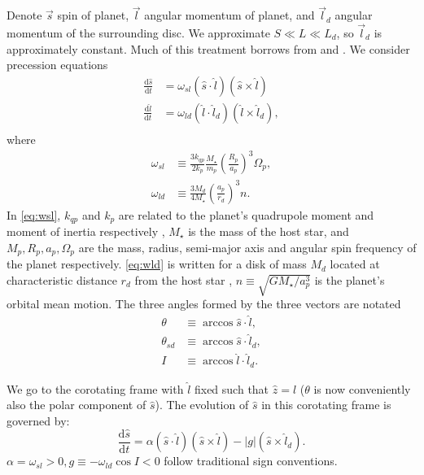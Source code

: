 \documentclass[
        fleqn,
        usenatbib,
    ]{mnras}
\newcommand*{\rd}[2]{\frac{\mathrm{d}#1}{\mathrm{d}#2}}
\newcommand*{\abs}[1]{\left|#1\right|}
\newcommand*{\p}[1]{\left(#1\right)}
\begin{document}
Denote $\vec{s}$ spin of planet, $\vec{l}$ angular momentum of planet, and
$\vec{l}_d$ angular momentum of the surrounding disc. We approximate $S \ll L
\ll L_d$, so $\vec{l}_d$ is approximately constant. Much of this treatment
borrows from \citealp{anderson2018teeter} and \citealp{millholland_disk}. We
consider precession equations
\begin{align}
    \rd{\hat{s}}{t} &= \omega_{sl} \p{\hat{s} \cdot \hat{l}}
        \p{\hat{s} \times \hat{l}}\label{eq:dsdt}\\
    \rd{\hat{l}}{t} &= \omega_{ld}\p{\hat{l} \cdot \hat{l}_d}
        \p{\hat{l} \times \hat{l}_d},\label{eq:dldt}\\
\end{align}
where
\begin{align}
    \omega_{sl} &\equiv \frac{3k_{qp}}{2k_p} \frac{M_\star}{m_p}
        \p{\frac{R_p}{a_p}}^3 \Omega_p,\label{eq:wsl}\\
    \omega_{ld} &\equiv \frac{3M_d}{4M_\star}\p{\frac{a_p}{r_d}}^3 n
        .\label{eq:wld}
\end{align}
In \autoref{eq:wsl}, $k_{qp}$ and $k_p$ are related to the planet's quadrupole
moment and moment of inertia respectively \citep[see][]{lai2018}, $M_\star$ is
the mass of the host star, and $M_p, R_p, a_p, \Omega_p$ are the mass, radius,
semi-major axis and angular spin frequency of the planet respectively.
\autoref{eq:wld} is written for a disk of mass $M_d$ located at characteristic
distance $r_d$ from the host star \citep[see][for a power-law disk
profile]{millholland_disk}, $n \equiv \sqrt{GM_\star/a_p^3}$ is the planet's
orbital mean motion. The three angles formed by the three vectors are notated
\begin{align}
    \theta &\equiv \arccos \hat{s} \cdot \hat{l},\\
    \theta_{sd} &\equiv \arccos \hat{s} \cdot \hat{l}_d,\\
    I &\equiv \arccos \hat{l} \cdot \hat{l}_d.
\end{align}

We go to the corotating frame with $\hat{l}$ fixed such that $\hat{z} =
\hat{l}$ ($\theta$ is now conveniently also the polar component of $\hat{s}$).
The evolution of $\hat{s}$ in this corotating frame is governed by:
\begin{equation}
    \rd{\hat{s}}{t} = \alpha \p{\hat{s} \cdot \hat{l}}
            \p{\hat{s} \times \hat{l}}
        - \abs{g}\p{\hat{s} \times \hat{l}_d}.
\end{equation}
$\alpha = \omega_{sl} > 0, g \equiv -\omega_{ld}\cos I < 0$ follow traditional
sign conventions.
\end{document}

